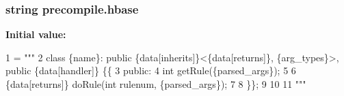 \hypertarget{namespaceprecompile_a915445fe95e0ce576375efaa28f9e9cf}{
\subsubsection[{hbase}]{\setlength{\rightskip}{0pt plus 5cm}string precompile.\-hbase}}\label{namespaceprecompile_a915445fe95e0ce576375efaa28f9e9cf}
{\bfseries Initial value\-:}
\begin{DoxyCode}
1 = \textcolor{stringliteral}{"""}
2 \textcolor{stringliteral}{class \{name\}: public \{data[inherits]\}<\{data[returns]\}, \{arg\_types\}>, public \{data[handler]\} \{\{}
3 \textcolor{stringliteral}{public:}
4 \textcolor{stringliteral}{    int getRule(\{parsed\_args\});}
5 \textcolor{stringliteral}{    }
6 \textcolor{stringliteral}{    \{data[returns]\} doRule(int rulenum, \{parsed\_args\});}
7 \textcolor{stringliteral}{}
8 \textcolor{stringliteral}{\}\};}
9 \textcolor{stringliteral}{}
10 \textcolor{stringliteral}{}
11 \textcolor{stringliteral}{"""}
\end{DoxyCode}
